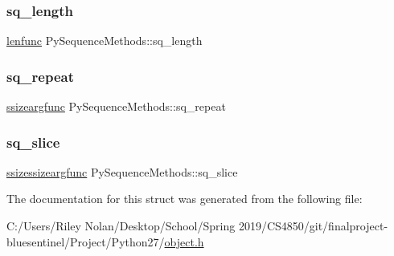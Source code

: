 \mbox{\label{struct_py_sequence_methods_a065df8805c9fe2274312a52efa70461a}} 
\subsubsection{\texorpdfstring{sq\_length}{sq\_length}}
{\footnotesize\ttfamily \mbox{\hyperlink{_python27_2object_8h_a07099ee62617991d223a386bb7f09008}{lenfunc}} Py\+Sequence\+Methods\+::sq\+\_\+length}

\mbox{\label{struct_py_sequence_methods_afa5e868a77ebfd808b4286aea874230a}} 
\subsubsection{\texorpdfstring{sq\_repeat}{sq\_repeat}}
{\footnotesize\ttfamily \mbox{\hyperlink{_python27_2object_8h_a0c13a44d945e5ad963c3db8584d308cb}{ssizeargfunc}} Py\+Sequence\+Methods\+::sq\+\_\+repeat}

\mbox{\label{struct_py_sequence_methods_ab1c2147b3135f575ebbf169ae147edfa}} 
\subsubsection{\texorpdfstring{sq\_slice}{sq\_slice}}
{\footnotesize\ttfamily \mbox{\hyperlink{_python27_2object_8h_ab30aa8df5679dd34d92fb2926b0da313}{ssizessizeargfunc}} Py\+Sequence\+Methods\+::sq\+\_\+slice}



The documentation for this struct was generated from the following file\+:\begin{DoxyCompactItemize}
\item 
C\+:/\+Users/\+Riley Nolan/\+Desktop/\+School/\+Spring 2019/\+C\+S4850/git/finalproject-\/bluesentinel/\+Project/\+Python27/\mbox{\hyperlink{_python27_2object_8h}{object.\+h}}\end{DoxyCompactItemize}
